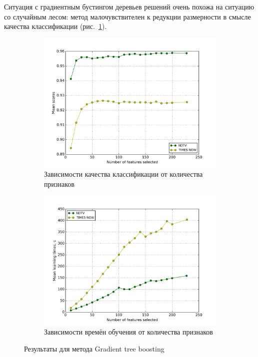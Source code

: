 \par
Ситуация с градиентным бустингом деревьев решений очень похожа на ситуацию со случайным лесом: метод малочувствителен к редукции размерности в смысле качества классификации (рис.~\ref{fig:gtb_rfs}).

\begin{figure}[h!]
    \centering
	\begin{subfigure}{0.45\textwidth}
		\includegraphics[width=\textwidth]{images/RFS-GTB.png}
		\caption{Зависимости качества классификации от количества признаков}
	\end{subfigure}
	\begin{subfigure}{0.45\textwidth}
		\includegraphics[width=\textwidth]{images/RFS-GTBTime.png}
		\caption{Зависимости времён обучения от количества признаков}
	\end{subfigure}
	\caption{Результаты для метода Gradient tree boosting}\label{fig:gtb_rfs}
\end{figure}
\par
